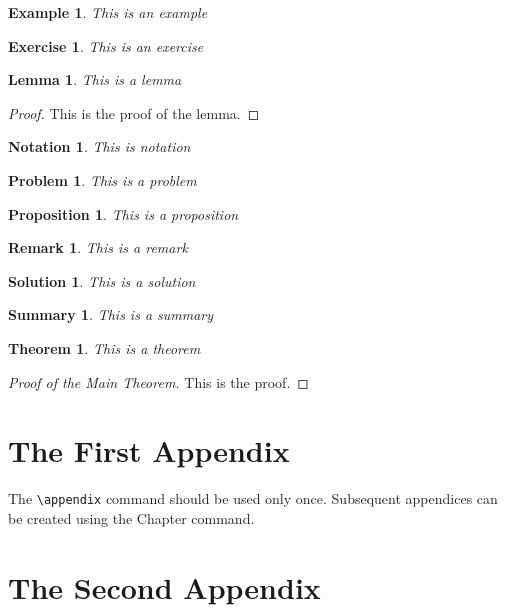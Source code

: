 \documentclass{amsbook}%
\theoremstyle{plain}
\newtheorem{example}{Example}
\newtheorem{exercise}{Exercise}
\newtheorem{lemma}{Lemma}
\newtheorem{notation}{Notation}
\newtheorem{problem}{Problem}
\newtheorem{proposition}{Proposition}
\newtheorem{remark}{Remark}
\newtheorem{solution}{Solution}
\newtheorem{summary}{Summary}
\newtheorem{theorem}{Theorem}
\numberwithin{equation}{section}
\begin{document}
\begin{example}
This is an example
\end{example}

\begin{exercise}
This is an exercise
\end{exercise}

\begin{lemma}
This is a lemma
\end{lemma}

\begin{proof}
This is the proof of the lemma.
\end{proof}

\begin{notation}
This is notation
\end{notation}

\begin{problem}
This is a problem
\end{problem}

\begin{proposition}
This is a proposition
\end{proposition}

\begin{remark}
This is a remark
\end{remark}

\begin{solution}
This is a solution
\end{solution}

\begin{summary}
This is a summary
\end{summary}

\begin{theorem}
This is a theorem
\end{theorem}

\begin{proof}
[Proof of the Main Theorem]This is the proof.
\end{proof}

\backmatter \appendix

\chapter{The First Appendix}

The \verb"\appendix" command should be used only once. Subsequent
appendices can be created using the Chapter command.

\chapter{The Second Appendix}
\end{document}
